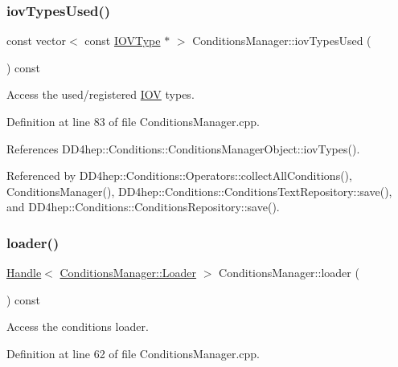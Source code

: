 \subsubsection{\texorpdfstring{iov\+Types\+Used()}{iovTypesUsed()}}
{\footnotesize\ttfamily const vector$<$ const \hyperlink{class_d_d4hep_1_1_i_o_v_type}{I\+O\+V\+Type} $\ast$ $>$ Conditions\+Manager\+::iov\+Types\+Used (\begin{DoxyParamCaption}{ }\end{DoxyParamCaption}) const}



Access the used/registered \hyperlink{class_d_d4hep_1_1_i_o_v}{I\+OV} types. 



Definition at line 83 of file Conditions\+Manager.\+cpp.



References D\+D4hep\+::\+Conditions\+::\+Conditions\+Manager\+Object\+::iov\+Types().



Referenced by D\+D4hep\+::\+Conditions\+::\+Operators\+::collect\+All\+Conditions(), Conditions\+Manager(), D\+D4hep\+::\+Conditions\+::\+Conditions\+Text\+Repository\+::save(), and D\+D4hep\+::\+Conditions\+::\+Conditions\+Repository\+::save().

\hypertarget{class_d_d4hep_1_1_conditions_1_1_conditions_manager_a3325caecfb6a97977a6f5338d30f38bb}{}\label{class_d_d4hep_1_1_conditions_1_1_conditions_manager_a3325caecfb6a97977a6f5338d30f38bb} 
\subsubsection{\texorpdfstring{loader()}{loader()}}
{\footnotesize\ttfamily \hyperlink{class_d_d4hep_1_1_handle}{Handle}$<$ \hyperlink{class_d_d4hep_1_1_conditions_1_1_conditions_manager_acd0f1e242240cc1c07a0d029a716a718}{Conditions\+Manager\+::\+Loader} $>$ Conditions\+Manager\+::loader (\begin{DoxyParamCaption}{ }\end{DoxyParamCaption}) const}



Access the conditions loader. 



Definition at line 62 of file Conditions\+Manager.\+cpp.




